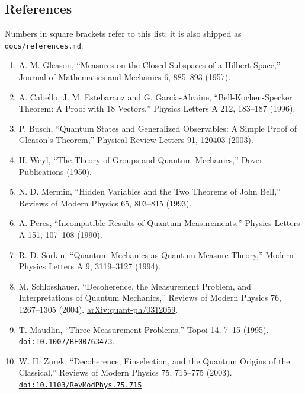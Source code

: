 \documentclass[
  11pt,
]{article}
\providecommand{\tightlist}{%
  \setlength{\itemsep}{0pt}\setlength{\parskip}{0pt}}
\begin{document}
\subsection{References}\label{references}

Numbers in square brackets refer to this list; it is also shipped as
\texttt{d\allowbreak{}o\allowbreak{}c\allowbreak{}s\allowbreak{}/\allowbreak{}r\allowbreak{}e\allowbreak{}f\allowbreak{}e\allowbreak{}r\allowbreak{}e\allowbreak{}n\allowbreak{}c\allowbreak{}e\allowbreak{}s\allowbreak{}.\allowbreak{}m\allowbreak{}d}.

\begin{enumerate}
\def\labelenumi{\arabic{enumi}.}
\tightlist
\item
  A. M. Gleason, ``Measures on the Closed Subspaces of a Hilbert
  Space,'' Journal of Mathematics and Mechanics 6, 885--893 (1957).
\item
  A. Cabello, J. M. Estebaranz and G. García-Alcaine,
  ``Bell-Kochen-Specker Theorem: A Proof with 18 Vectors,'' Physics
  Letters A 212, 183--187 (1996).
\item
  P. Busch, ``Quantum States and Generalized Observables: A Simple Proof
  of Gleason's Theorem,'' Physical Review Letters 91, 120403 (2003).
\item
  H. Weyl, ``The Theory of Groups and Quantum Mechanics,'' Dover
  Publications (1950).
\item
  N. D. Mermin, ``Hidden Variables and the Two Theorems of John Bell,''
  Reviews of Modern Physics 65, 803--815 (1993).
\item
  A. Peres, ``Incompatible Results of Quantum Measurements,'' Physics
  Letters A 151, 107--108 (1990).
\item
  R. D. Sorkin, ``Quantum Mechanics as Quantum Measure Theory,'' Modern
  Physics Letters A 9, 3119--3127 (1994).
\item
  M. Schlosshauer, ``Decoherence, the Measurement Problem, and
  Interpretations of Quantum Mechanics,'' Reviews of Modern Physics 76,
  1267--1305 (2004).
  \href{https://arxiv.org/abs/quant-ph/0312059}{arXiv:quant-ph\allowbreak{}/\allowbreak{}0312059}.
\item
  T. Maudlin, ``Three Measurement Problems,'' Topoi 14, 7--15 (1995).
  \href{https://doi.org/10.1007/BF00763473}{\nolinkurl{doi:10.1007/BF00763473}}.
\item
  W. H. Zurek, ``Decoherence, Einselection, and the Quantum Origins of
  the Classical,'' Reviews of Modern Physics 75, 715--775 (2003).
  \href{https://doi.org/10.1103/RevModPhys.75.715}{\nolinkurl{doi:10.1103/RevModPhys.75.715}}.

\end{enumerate}
\end{document}
